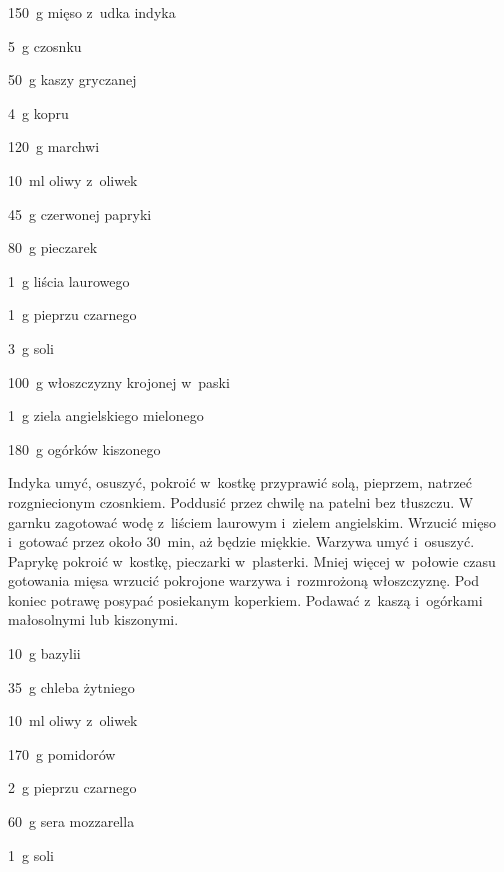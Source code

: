 \documentclass[../kucharek.tex]{subfiles}
\begin{document}
\begin{Ingred}
    \item \qty{150}{\gram} mięso z~udka indyka
    \item \qty{5}{\gram} czosnku
    \item \qty{50}{\gram} kaszy gryczanej
    \item \qty{4}{\gram} kopru
    \item \qty{120}{\gram} marchwi
    \item \qty{10}{\milli\litre} oliwy z~oliwek
    \item \qty{45}{\gram} czerwonej papryki
    \item \qty{80}{\gram} pieczarek
    \item \qty{1}{\gram} liścia laurowego
    \item \qty{1}{\gram} pieprzu czarnego
    \item \qty{3}{\gram} soli
    \item \qty{100}{\gram} włoszczyzny krojonej w~paski
    \item \qty{1}{\gram} ziela angielskiego mielonego
    \item \qty{180}{\gram} ogórków kiszonego
\end{Ingred}

Indyka umyć, osuszyć, pokroić w~kostkę przyprawić solą, pieprzem, natrzeć
rozgniecionym czosnkiem. Poddusić przez chwilę na patelni bez tłuszczu. W
garnku zagotować wodę z~liściem laurowym i~zielem angielskim. Wrzucić mięso
i~gotować przez około \qty{30}{\minute}, aż będzie miękkie. Warzywa umyć
i~osuszyć. Paprykę pokroić w~kostkę, pieczarki w~plasterki. Mniej więcej
w~połowie czasu gotowania mięsa wrzucić pokrojone warzywa i~rozmrożoną
włoszczyznę. Pod koniec potrawę posypać posiekanym koperkiem. Podawać z~kaszą
i~ogórkami małosolnymi lub kiszonymi.


\begin{Ingred}
    \item \qty{10}{\gram} bazylii
    \item \qty{35}{\gram} chleba żytniego
    \item \qty{10}{\milli\litre} oliwy z~oliwek
    \item \qty{170}{\gram} pomidorów
    \item \qty{2}{\gram} pieprzu czarnego
    \item \qty{60}{\gram} sera mozzarella
    \item \qty{1}{\gram} soli
\end{Ingred}
\end{document}
